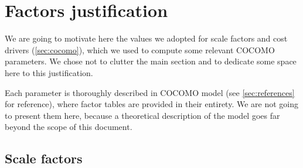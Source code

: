 \chapter{Factors justification}\label{chap:justification}

We are going to motivate here the values we adopted for scale factors and cost drivers (\cref{sec:cocomo}), which we used to compute some relevant COCOMO parameters. We chose not to clutter the main section and to dedicate some space here to this justification.

Each parameter is thoroughly described in COCOMO model (see \cref{sec:references} for reference), where factor tables are provided in their entirety. We are not going to present them here, because a theoretical description of the model goes far beyond the scope of this document.







\section{Scale factors}

